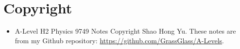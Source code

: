 \section*{Copyright}
\begin{itemize}
    \item A-Level H2 Physics 9749 Notes Copyright  Shao Hong Yu. These notes are from my Github repository: \url{https://github.com/GrassGlass/A-Levels}.









\end{itemize}
